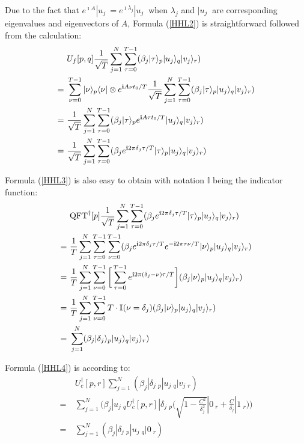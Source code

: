 Due to the fact that $e^{\imath A}|u_j\> = e^{\imath \lambda_j }|u_j\>$ when $\lambda_j$ and $|u_j\>$ are corresponding eigenvalues and eigenvectors of $A$, Formula (\ref{HHL2}) is straightforward followed from the calculation:
\begin{align*}
&U_f[p,q]\frac{1}{\sqrt{T}}\sum_{j = 1}^N\sum_{\tau = 0}^{T-1}(\beta_j|\tau\>_p|u_j\>_q|v_j\>_r) \\
=\ &\sum_{\nu = 0}^{T-1}|\nu\>_p\<\nu|\otimes e^{\imath A\nu t_0/T}\frac{1}{\sqrt{T}}\sum_{j = 1}^N\sum_{\tau = 0}^{T-1}(\beta_j|\tau\>_p|u_j\>_q|v_j\>_r) \\
=\ & \frac{1}{\sqrt{T}}\sum_{j = 1}^N\sum_{\tau = 0}^{T-1}(\beta_j|\tau\>_pe^{\imath A\tau t_0/T}|u_j\>_q|v_j\>_r) \\
=\ &\frac{1}{\sqrt{T}}\sum_{j = 1}^N\sum_{\tau = 0}^{T-1}(\beta_je^{\imath 2\pi \delta_j\tau/T}|\tau\>_p|u_j\>_q|v_j\>_r)
\end{align*}

Formula (\ref{HHL3}) is also easy to obtain with notation $\mathbb{I}$ being the indicator function:
\begin{align*}
&{\rm QFT}^\dag[p]\frac{1}{\sqrt{T}}\sum_{j = 1}^N\sum_{\tau = 0}^{T-1}(\beta_je^{\imath 2\pi \delta_j\tau/T}|\tau\>_p|u_j\>_q|v_j\>_r)\\
=\ &\frac{1}{T}\sum_{j = 1}^N\sum_{\tau = 0}^{T-1}\sum_{\nu = 0}^{T-1}(\beta_je^{\imath 2\pi \delta_j\tau/T} e^{-\imath2\pi\tau\nu/T}|\nu\>_p|u_j\>_q|v_j\>_r) \\
=\ &\frac{1}{T}\sum_{j = 1}^N\sum_{\nu = 0}^{T-1}\bigg[\sum_{\tau = 0}^{T-1}e^{\imath 2\pi (\delta_j-\nu)\tau/T}\bigg](\beta_j|\nu\>_p|u_j\>_q|v_j\>_r) \\
=\ &\frac{1}{T}\sum_{j = 1}^N\sum_{\nu = 0}^{T-1}T\cdot \mathbb{I}(\nu = \delta_j)(\beta_j|\nu\>_p|u_j\>_q|v_j\>_r) \\
=\ &\sum_{j = 1}^N (\beta_j|\delta_j\>_p|u_j\>_q|v_j\>_r)
\end{align*}

Formula (\ref{HHL4}) is according to:
\begin{align*}
&U_c^\dag[p,r]\sum_{j = 1}^N (\beta_j|\delta_j\>_p|u_j\>_q|v_j\>_r) \\
=\ &\sum_{j = 1}^N \Bigg(\beta_j|u_j\>_qU_c^\dag[p,r]|\delta_j\>_p\bigg(\sqrt{1-\frac{C^2}{\delta_j^2}}|0\>_r + \frac{C}{\delta_j}|1\>_r\bigg)\Bigg) \\
=\ &\sum_{j = 1}^N (\beta_j|\delta_j\>_p|u_j\>_q|0\>_r)
\end{align*}

